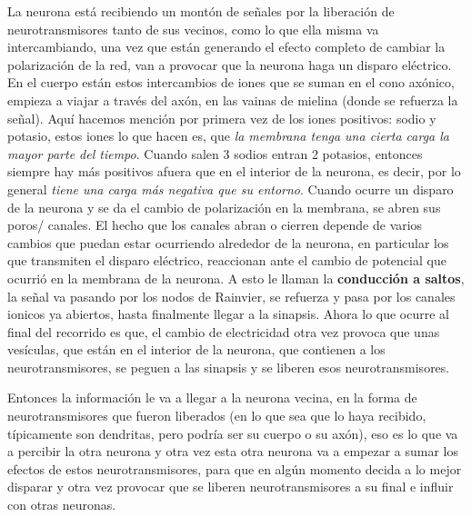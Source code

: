 La neurona está recibiendo un montón de señales por la liberación de neurotransmisores tanto de sus vecinos, como lo que ella misma va intercambiando, 
una vez que están generando el efecto completo de cambiar la polarización de
la red,  van a provocar que la neurona haga un disparo eléctrico. En el cuerpo están estos intercambios de iones que se suman en el cono axónico, empieza a viajar a través del axón,  en las vainas de mielina (donde se refuerza la señal). 
Aquí hacemos mención por primera vez de los iones positivos: sodio y potasio, estos iones lo que hacen es, que \emph{la membrana tenga una cierta carga la mayor parte del tiempo}. Cuando salen 3 sodios entran 2 potasios, entonces siempre hay más positivos afuera que en el interior de la neurona, es decir, por lo general  \emph{tiene una carga más negativa que su entorno}. Cuando ocurre un disparo de la neurona y se da el cambio de polarización en la membrana, se abren sus poros/ canales. El hecho que los canales abran o cierren depende de varios cambios que puedan estar ocurriendo alrededor de la neurona, en particular los que transmiten el disparo eléctrico, reaccionan ante el cambio de potencial que ocurrió en la membrana de la neurona. A esto le llaman la \textbf{conducción a saltos}, la señal va pasando por los nodos de Rainvier, se refuerza y pasa por los canales ionicos ya abiertos, hasta finalmente llegar a la sinapsis. Ahora lo que ocurre al final del recorrido es que, el cambio de electricidad otra vez provoca que unas vesículas, que están en el interior de la neurona,  que contienen a los neurotransmisores, se peguen a las sinapsis y se liberen esos neurotransmisores. 

Entonces la información le va a llegar a la neurona vecina, en la forma de neurotransmisores que fueron liberados (en lo que sea que lo haya recibido, típicamente son dendritas, pero podría ser su cuerpo o su axón), eso es lo que va a percibir la otra neurona y otra vez esta otra neurona va a empezar a sumar los efectos de estos neurotransmisores, para que en algún momento decida a lo mejor disparar y otra vez provocar que se liberen neurotransmisores a su final e influir con otras neuronas.

